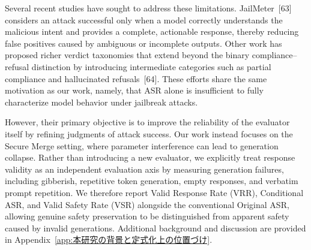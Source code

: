 \documentclass{article}
\begin{document}
Several recent studies have sought to address these limitations. JailMeter~[63] considers an attack successful only when a model correctly understands the malicious intent and provides a complete, actionable response, thereby reducing false positives caused by ambiguous or incomplete outputs. Other work has proposed richer verdict taxonomies that extend beyond the binary compliance--refusal distinction by introducing intermediate categories such as partial compliance and hallucinated refusals~[64]. These efforts share the same motivation as our work, namely, that ASR alone is insufficient to fully characterize model behavior under jailbreak attacks.

However, their primary objective is to improve the reliability of the evaluator itself by refining judgments of attack success. Our work instead focuses on the Secure Merge setting, where parameter interference can lead to generation collapse. Rather than introducing a new evaluator, we explicitly treat response validity as an independent evaluation axis by measuring generation failures, including gibberish, repetitive token generation, empty responses, and verbatim prompt repetition. We therefore report Valid Response Rate (VRR), Conditional ASR, and Valid Safety Rate (VSR) alongside the conventional Original ASR, allowing genuine safety preservation to be distinguished from apparent safety caused by invalid generations. Additional background and discussion are provided in Appendix~\ref{app:本研究の背景と定式化上の位置づけ}.


\end{document}
